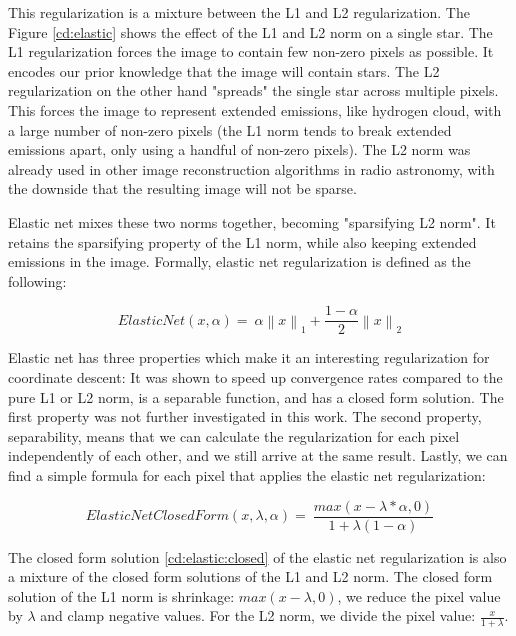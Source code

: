This regularization is a mixture between the L1 and L2 regularization. The Figure \ref{cd:elastic} shows the effect of the L1 and L2 norm on a single star. The L1 regularization forces the image to contain few non-zero pixels as possible. It encodes our prior knowledge that the image will contain stars. The L2 regularization on the other hand "spreads" the single star across multiple pixels. This forces the image to represent extended emissions, like hydrogen cloud, with a large number of non-zero pixels (the L1 norm tends to break extended emissions apart, only using a handful of non-zero pixels). The L2 norm was already used in other image reconstruction algorithms in radio astronomy\cite{ferrari2014distributed}, with the downside that the resulting image will not be sparse.

Elastic net mixes these two norms together, becoming "sparsifying L2 norm". It retains the sparsifying property of the L1 norm, while also keeping extended emissions in the image. Formally, elastic net regularization is defined as the following:

\begin{equation}\label{cd:elastic:formula}
ElasticNet(x, \alpha) = \: \alpha \left \|x \right \|_1 + \frac{1-\alpha}{2}  \left \|x \right \|_2
\end{equation}

Elastic net has three properties which make it an interesting regularization for coordinate descent: It was shown to speed up convergence rates compared to the pure L1 or L2 norm\cite{friedman2010regularization}, is a separable function, and has a closed form solution. The first property was not further investigated in this work. The second property, separability, means that we can calculate the regularization for each pixel independently of each other, and we still arrive at the same result. Lastly, we can find a simple formula for each pixel that applies the elastic net regularization:

\begin{equation}\label{cd:elastic:closed}
ElasticNetClosedForm(x, \lambda ,\alpha) = \: \frac{max(x - \lambda * \alpha, 0)}{1+\lambda(1 - \alpha)}
\end{equation}

The closed form solution \eqref{cd:elastic:closed} of the elastic net regularization is also a mixture of the closed form solutions of the L1 and L2 norm. The closed form solution of the L1 norm is shrinkage: $max(x - \lambda, 0)$, we reduce the pixel value by $\lambda$ and clamp negative values. For the L2 norm, we divide the pixel value: $\frac{x}{1+\lambda}$.


